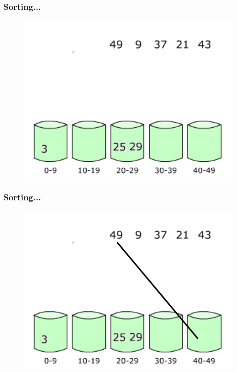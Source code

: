 \documentclass[pdf]{beamer}
\begin{document}
\begin{frame}
	\frametitle{Sorting...}
	\begin{figure}
		\includegraphics[scale=.3]{Figure/6.png}
	\end{figure}	
\end{frame}

\begin{frame}
	\frametitle{Sorting...}
	\begin{figure}
		\includegraphics[scale=.3]{Figure/7.png}
	\end{figure}	
\end{frame}
\end{document}
